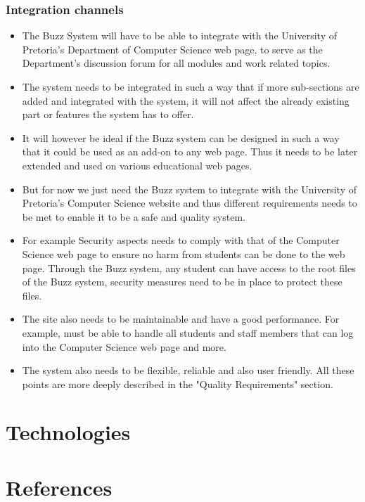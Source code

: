 \documentclass[a4paper]{article}
\begin{document}
\subsubsection{Integration channels }
\begin{itemize}
\item The Buzz System will have to be able to integrate with the University of Pretoria's Department of Computer Science web page, to serve as the Department's discussion forum for all modules and work related topics.  
\item The system needs to be integrated in such a way that if more sub-sections are added and integrated with the system, it will not affect the already existing part or features the system has to offer. 
\item It will however be ideal if the Buzz system can be designed in such a way that it could be used as an add-on to any web page. Thus it needs to be later extended and used on various educational web pages.
\item But for now we just need the Buzz system to integrate with the  University of Pretoria's Computer Science website and thus different requirements needs to be met to enable it to be a safe and quality system. 
\item For example Security aspects needs to comply with that of the Computer Science web page to ensure no harm from students can be done to the web page. Through the Buzz system, any student can have access to the root files of the Buzz system, security measures need to be in place to protect these files.
\item The site also needs to be maintainable and  have a good performance. For example, must be able to handle all students and staff members that can log into the Computer Science web page and more.
\item The system also needs to be flexible, reliable and also user friendly. All these points are more deeply described in the "Quality Requirements" section.
\end{itemize}

\section{Technologies}

\section{References}
\end{document}
